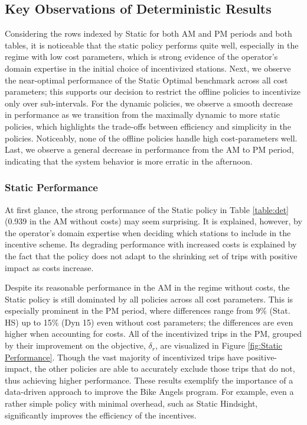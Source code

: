 \subsection{Key Observations of Deterministic Results}
Considering the rows indexed by Static for both AM and PM periods and both tables, it is noticeable that the static policy performs quite well, especially in the regime with low cost parameters, which is strong evidence of the operator's domain expertise in the initial choice of incentivized stations. Next, we observe the near-optimal performance of the Static Optimal benchmark across all cost parameters; this supports our decision to restrict the offline policies to  incentivize only over sub-intervals. For the dynamic policies, we observe a smooth decrease in performance as we transition from the maximally dynamic to more static policies, which highlights the trade-offs between efficiency and simplicity in the policies. Noticeably, none of the offline policies handle high cost-parameters well. Last, we observe a general decrease in performance from the AM to PM period, indicating that the system behavior is more erratic in the afternoon.
 
\subsubsection{Static Performance}
At first glance, the strong performance of the Static policy in Table \ref{table:det} (0.939 in the AM without costs) may seem surprising. It is explained, however, by the operator's domain expertise when deciding which stations to include in the incentive scheme. Its degrading performance with increased costs is explained by the fact that the policy does not adapt to the shrinking set of trips with positive impact as costs increase.

Despite its reasonable performance in the AM in the regime without costs, the Static policy is still dominated by all policies across  all cost parameters. This is especially prominent in the PM period, where differences range from 9\% (Stat. HS)  up to 15\% (Dyn 15) even without cost parameters; the differences are even higher when accounting for costs. All of the incentivized trips in the PM, grouped by their improvement on the objective, $\delta_r$, are visualized in Figure \ref{fig:Static Performance}. Though the vast majority of incentivized trips have positive-impact, the other policies are able to accurately exclude those trips that do not, thus achieving higher performance.  These results exemplify the importance of a data-driven approach to improve the Bike Angels program. For example, even a rather simple policy with minimal overhead, such as Static Hindsight, significantly improves the efficiency of the incentives.

